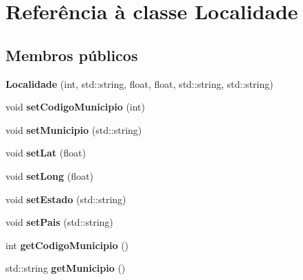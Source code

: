\hypertarget{classLocalidade}{}\section{Referência à classe Localidade}
\label{classLocalidade}
\subsection*{Membros públicos}
\begin{DoxyCompactItemize}
\item 
\mbox{\label{classLocalidade_afba433c839d548dac5a04b3ff5e90082}} 
{\bfseries Localidade} (int, std\+::string, float, float, std\+::string, std\+::string)
\item 
\mbox{\label{classLocalidade_a38bb0027272b4b39b88698dc5820fbc6}} 
void {\bfseries set\+Codigo\+Municipio} (int)
\item 
\mbox{\label{classLocalidade_a90ac71109a4954863bb045a57e3fc29d}} 
void {\bfseries set\+Municipio} (std\+::string)
\item 
\mbox{\label{classLocalidade_af9abc70199d4f50cd90add07c6d6e617}} 
void {\bfseries set\+Lat} (float)
\item 
\mbox{\label{classLocalidade_a9b5f805c802337480712bf010669ced8}} 
void {\bfseries set\+Long} (float)
\item 
\mbox{\label{classLocalidade_a71acb8cadaee73dbdf27a244cc9d5135}} 
void {\bfseries set\+Estado} (std\+::string)
\item 
\mbox{\label{classLocalidade_af8e89f3bdcf8dd7bb1f3f74fdc8bc119}} 
void {\bfseries set\+Pais} (std\+::string)
\item 
\mbox{\label{classLocalidade_af83a061d36464f5d91fefa5b68206112}} 
int {\bfseries get\+Codigo\+Municipio} ()
\item 
\mbox{\label{classLocalidade_afd2127dad81d3131016f1dd4bcb9823b}} 
std\+::string {\bfseries get\+Municipio} ()
\item 

\end{DoxyCompactItemize}
